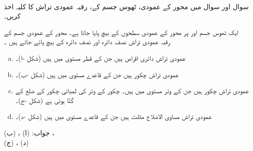 \\
سوال  اور سوال  میں  محور کے عمودی، ٹھوس جسم کے، رقبہ عمودی تراش  کا کلیہ اخذ کریں۔ 

ایک ٹھوس جسم   اور  پر  محور  کے عمودی سطحوں کے بیچ پایا جاتا ہے۔   محور کے عمودی جسم  کے رقبہ عمودی تراش نصف دائرہ  اور نصف دائرہ  کے بیچ پائے جاتے ہیں ۔ 
\begin{enumerate}[a.]
\item
عمودی تراش دائری اقراص ہیں جن کے قطر  مستوی میں ہیں (شکل -ا)۔
\item
عمودی تراش چکور ہیں جن کے قاعدے  مستوی میں ہیں (شکل -ب)۔
\item
عمودی تراش چکور ہیں جن کے وتر  مستوی میں ہیں۔ چکور کے وتر کی لمبائی چکور کے ضلع کے  گنّا ہوتی ہے (شکل -ج)۔
\item
عمودی تراش مساوی الاضلاع مثلث ہیں جن کے قاعدے  مستوی میں ہیں (شکل -د)۔
\end{enumerate}
جواب:\quad
(ا) ، (ب) ،\\ (ج) ، (د) 
